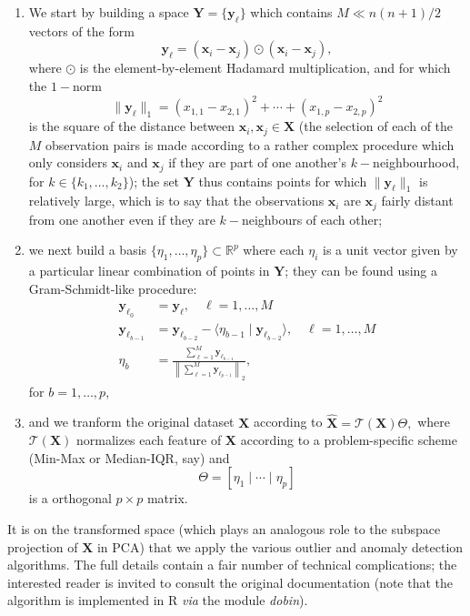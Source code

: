 \begin{enumerate}[noitemsep] 
\item We start by building a space $\mathbf{Y}=\{\mathbf{y}_{\ell}\}$  which contains $M\ll n(n+1)/2$  vectors of the form $$\mathbf{y}_{\ell}=(\mathbf{x}_i -\mathbf{x}_j)\odot (\mathbf{x}_i -\mathbf{x}_j), $$ where $\odot$ is the element-by-element Hadamard multiplication, and for which the $1-$norm  $$\|\mathbf{y}_{\ell}\|_1=(x_{1,1}-x_{2,1})^2+\cdots +(x_{1,p}-x_{2,p})^2 $$ is the square of the distance between $\mathbf{x}_i,\mathbf{x}_j \in\mathbf{X}$ (the selection of each of the $M$ observation pairs is made according to a rather complex procedure which only considers $\mathbf{x}_i$ and $\mathbf{x}_j$ if they are part of one another's $k-$neighbourhood, for $k\in\{k_1,\ldots, k_2\}$); the set $\mathbf{Y}$ thus contains points for which $\|\mathbf{y}_{\ell}\|_1$ is relatively large, which is to say that the observations $\mathbf{x}_i$ are $\mathbf{x}_j$ fairly distant from one another even if they are $k-$neighbours of each other;
\item we next build a basis $\{\eta_1,\ldots,\eta_p\}\subset \mathbb{R}^p$ where each  $\eta_i$ is a unit vector given by a particular linear combination of points in $\mathbf{Y}$; they can be found using a  Gram-Schmidt-like procedure: 
\begin{align*}
\mathbf{y}_{\ell_0}&=\mathbf{y}_{\ell},\quad \ell=1,\ldots, M \\ 
\mathbf{y}_{\ell_{b-1}}&=\mathbf{y}_{\ell_{b-2}}-\langle\eta_{b-1} \mid \mathbf{y}_{\ell_{b-2}}\rangle,\quad \ell=1,\ldots, M \\ 
\eta_b&=\frac{\sum_{\ell=1}^M\mathbf{y}_{\ell_{b-1}}}{\left\|\sum_{\ell=1}^M\mathbf{y}_{\ell_{p-1}}\right\|_2},
\end{align*} for $b=1,\ldots,p$,
\item and we tranform the original dataset   $\mathbf{X}$ according to  $\hat{\mathbf{X}}=\mathcal{T}(\mathbf{X})\Theta,$ where $\mathcal{T}(\mathbf{X})$ normalizes each feature of  $\mathbf{X}$ according to a problem-specific scheme  (Min-Max or Median-IQR, say) and $$\Theta=[\eta_1\mid\cdots\mid \eta_p]$$ is a orthogonal $p\times p$ matrix.  
\end{enumerate}
It is on the transformed space (which plays an analogous role to the subspace projection of  $\mathbf{X}$ in PCA) that we apply the various outlier and anomaly detection algorithms.\newl 
The full details contain a fair number of technical complications; the interested reader is invited to consult the original documentation \cite{A6} (note that the algorithm is implemented in R \textit{via} the module \textit{dobin}). 
%
